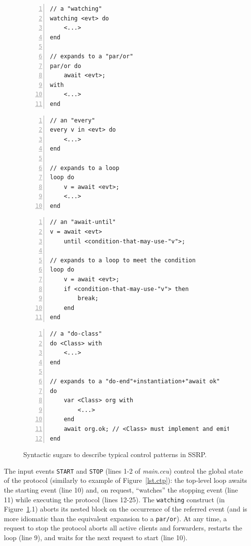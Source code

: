 \documentclass{sigplanconf}
\newcommand{\code}[1] {{\small{\texttt{#1}}}}
\newcommand{\1}{\;}
\newcommand{\2}{\;\;}
\newcommand{\3}{\;\;\;}
\newcommand{\5}{\;\;\;\;\;}
\begin{document}
\begin{figure}%
\begin{lstlisting}[numbers=left,xleftmargin=3em,title=(1) A \code{watching} 
expands to a \code{par/or}.]
// a "watching"
watching <evt> do
    <...>
end

// expands to a "par/or"
par/or do
    await <evt>;
with
    <...>
end
\end{lstlisting}
\begin{lstlisting}[numbers=left,xleftmargin=3em,title=(2) An \code{every} 
expands to a \code{loop}.]
// an "every"
every v in <evt> do
    <...>
end

// expands to a loop
loop do
    v = await <evt>;
    <...>
end
\end{lstlisting}
\begin{lstlisting}[numbers=left,xleftmargin=3em,title=(3) An \code{await-until} 
expands to a \code{loop} to meet the condition.]
// an "await-until"
v = await <evt>
    until <condition-that-may-use-"v">;

// expands to a loop to meet the condition
loop do
    v = await <evt>;
    if <condition-that-may-use-"v"> then
        break;
    end
end
\end{lstlisting}
\begin{lstlisting}[numbers=left,xleftmargin=3em,title=(4) A \code{do-<class>} 
waits for the organism to terminate.]
// a "do-class"
do <Class> with
    <...>
end

// expands to a "do-end"+instantiation+"await ok"
do
    var <Class> org with
        <...>
    end
    await org.ok; // <Class> must implement and emit
end
\end{lstlisting}
\caption{ Syntactic sugars to describe typical control patterns in SSRP.
\label{fig.sugars}
}
\end{figure}


The input events \code{START} and \code{STOP} (lines 1-2 of \emph{main.ceu}) 
control the global state of the protocol (similarly to example of 
Figure~\ref{lst.ctp}):
the top-level loop awaits the starting event (line 10) and, on request, 
``watches'' the stopping event (line 11) while executing the protocol (lines 
12-25).
The \code{watching} construct (in Figure~\ref{fig.sugars}.1) aborts its nested 
block on the occurrence of the referred event (and is more idiomatic than the 
equivalent expansion to a \code{par/or}).
%
At any time, a request to stop the protocol aborts all active clients and 
forwarders, restarts the loop (line 9), and waits for the next request to start 
(line 10).
\end{document}
